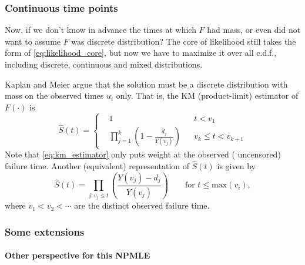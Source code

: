 \documentclass[a4paper,12pt]{article}
\begin{document}
\subsubsection{Continuous time points}
\label{sec:cont-time-points}

Now, if we don't know in advance the times at which $F$ had mass, or even did not want to assume $F$ was discrete distribution? The core of likelihood still takes the form of \eqref{eq:likelihood_core}, but now we have to maximize it over all c.d.f., including discrete, continuous and mixed distributions.
\par
Kaplan and Meier argue that the solution must be a discrete distribution with mass on the observed times $u_i$ only. That is, the KM (product-limit) estimator of $F\left(\cdot\right)$ is
\begin{equation}
  \label{eq:km_estimator}
  \hat{S}\left(t\right) =\left\{
  \begin{aligned}    
    & 1 && t < v_1    \\
    & \prod\limits_{j = 1}^{k}
      \left(1 - \frac{d_j}{Y\left(v_j\right)}\right) && v_{k} \leq t < v_{k + 1}
  \end{aligned}
  \right.  
\end{equation}
Note that \eqref{eq:km_estimator} only puts weight at the observed ({\color{red} uncensored}) failure time. Another (equivalent) representation of $\hat{S}\left(t\right)$ is given by
\begin{equation}
  \label{eq:km_estimator_2}
  \hat{S}\left(t\right) = \prod\limits_{j:v_j \leq t}\left(
    \frac{Y\left(v_j\right) - d_j}{Y\left(v_j\right)}
  \right)
  \quad\quad \text{for } t \leq \mathrm{max}\left(v_i\right)
  ,
\end{equation}
where $v_1 < v_2 < \cdots$ are the distinct observed failure time.

\subsubsection{Some extensions}
\label{sec:some-extensions}

\paragraph{Other perspective for this NPMLE}
\end{document}
